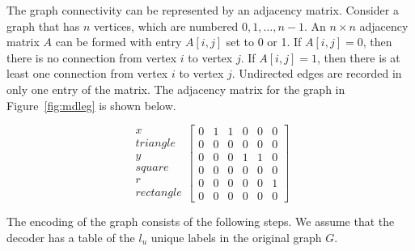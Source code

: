 The graph connectivity can be represented by an adjacency matrix. Consider
a graph that has $n$ vertices, which are numbered \(0,1,\ldots,n-1\). An $n
\times n$ adjacency matrix $A$ can be formed with entry $A[i,j]$ set to 0
or 1.  If $A[i,j]=0$, then there is no connection from vertex $i$ to vertex
$j$.  If $A[i,j]=1$, then there is at least one connection from vertex $i$
to vertex $j$.  Undirected edges are recorded in only one entry of the
matrix.  The adjacency matrix for the graph in Figure~\ref{fig:mdleg} is
shown below.

\[ \begin{array}{r} x \\ triangle \\ y \\ square \\ r \\ rectangle
   \end{array} \left[ \begin{array}{cccccc}
      0 & 1 & 1 & 0 & 0 & 0 \\
      0 & 0 & 0 & 0 & 0 & 0 \\
      0 & 0 & 0 & 1 & 1 & 0 \\
      0 & 0 & 0 & 0 & 0 & 0 \\
      0 & 0 & 0 & 0 & 0 & 1 \\
      0 & 0 & 0 & 0 & 0 & 0
   \end{array} \right] \]

The encoding of the graph consists of the following steps.  We assume that
the decoder has a table of the $l_u$ unique labels in the original graph
$G$.


